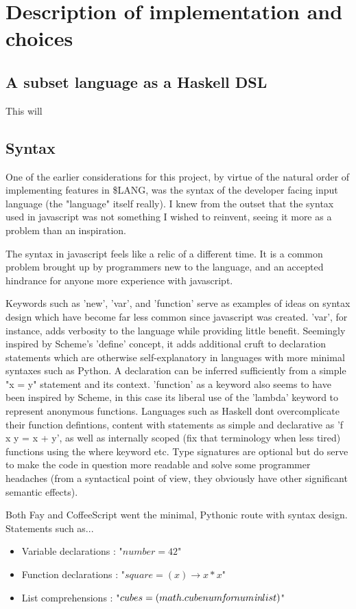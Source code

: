 \documentclass[11pt]{article}
\newcommand{\lang}{\$LANG}
\begin{document}
\pagebreak

\section{Description of implementation and choices}

\subsection{A subset language as a Haskell DSL}
This will 

\subsection{Syntax}
One of the earlier considerations for this project, by virtue of the natural order
of implementing features in \lang, was the syntax of the developer facing input 
language (the "language" itself really). I knew from the outset that the syntax
used in javascript was not something I wished to reinvent, seeing it more as a
problem than an inspiration. 

The syntax in javascript feels like a relic of a different time. It is a common
problem brought up by programmers new to the language, and an accepted
hindrance for anyone more experience with javascript. 

Keywords such as 'new', 'var', and 'function' serve as examples of ideas on syntax
design which have become far less common since javascript was created. 'var', for
instance, adds verbosity to the language while providing little benefit. Seemingly
inspired by Scheme's 'define' concept, it adds additional cruft to declaration 
statements which are otherwise self-explanatory in languages with more minimal 
syntaxes such as Python. A declaration can be inferred sufficiently from a simple
"x = y" statement and its context. 'function' as a keyword also seems to have been
inspired by Scheme, in this case its liberal use of the 'lambda' keyword to represent
anonymous functions. Languages such as Haskell dont overcomplicate their function
defintions, content with statements as simple and declarative as 'f x y = x + y',
as well as internally scoped (fix that terminology when less tired) functions using
the where keyword etc.
Type signatures are optional but do serve to make the code in question more readable and
solve some programmer headaches (from a syntactical point of view, they obviously have other 
significant semantic effects). 

Both Fay and CoffeeScript went the minimal, Pythonic route with syntax design. Statements
such as...
\begin{itemize}
\item Variable declarations : "\(number = 42\)"
\item Function declarations : "\(square = (x) \rightarrow x * x\)"
\item List comprehensions : "\(cubes = (math.cube num \emph{for} num \emph{in} list)\)"
\end{itemize}
\end{document}
